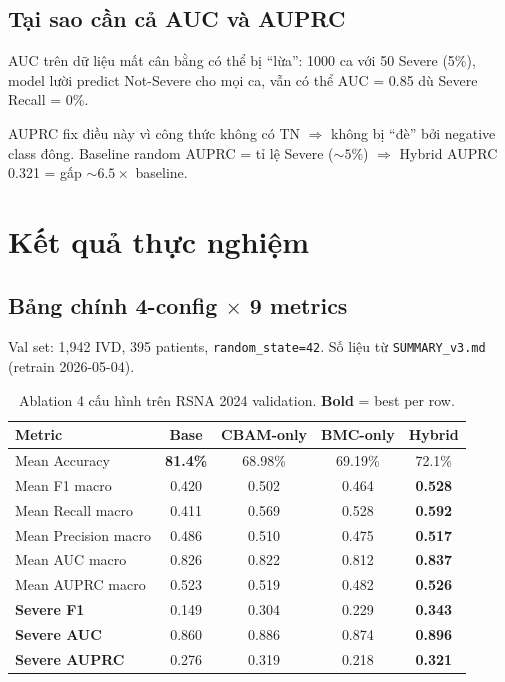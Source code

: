 \documentclass[11pt,a4paper]{article}
\newcommand{\best}[1]{\textcolor{best}{\textbf{#1}}}
\begin{document}
\subsection{Tại sao cần cả AUC và AUPRC}

\noindent AUC trên dữ liệu mất cân bằng có thể bị ``lừa'': 1000 ca với
50 Severe (5\%), model lười predict Not-Severe cho mọi ca, vẫn có thể
AUC = 0.85 dù Severe Recall = 0\%.

\noindent AUPRC fix điều này vì công thức không có TN $\Rightarrow$
không bị ``đè'' bởi negative class đông. Baseline random AUPRC = tỉ lệ
Severe ($\sim 5\%$) $\Rightarrow$ Hybrid AUPRC 0.321 = gấp $\sim 6.5
\times$ baseline.

\section{Kết quả thực nghiệm}

\subsection{Bảng chính 4-config $\times$ 9 metrics}

\noindent Val set: 1,942 IVD, 395 patients, \verb|random_state=42|.
Số liệu từ \texttt{SUMMARY\_v3.md} (retrain 2026-05-04).

\begin{table}[h]
\centering
\caption{Ablation 4 cấu hình trên RSNA 2024 validation. \best{Bold} = best per row.}
\label{tab:main_results}
\begin{tabular}{@{}lcccc@{}}
\toprule
\rowcolor{tablehdr}
Metric & Base & CBAM-only & BMC-only & \best{Hybrid} \\
\midrule
Mean Accuracy        & \best{81.4\%} & 68.98\% & 69.19\% & 72.1\% \\
Mean F1 macro        & 0.420 & 0.502 & 0.464 & \best{0.528} \\
Mean Recall macro    & 0.411 & 0.569 & 0.528 & \best{0.592} \\
Mean Precision macro & 0.486 & 0.510 & 0.475 & \best{0.517} \\
Mean AUC macro       & 0.826 & 0.822 & 0.812 & \best{0.837} \\
Mean AUPRC macro     & 0.523 & 0.519 & 0.482 & \best{0.526} \\
\midrule
\textbf{Severe F1}    & 0.149 & 0.304 & 0.229 & \best{0.343} \\
\textbf{Severe AUC}   & 0.860 & 0.886 & 0.874 & \best{0.896} \\
\textbf{Severe AUPRC} & 0.276 & 0.319 & 0.218 & \best{0.321} \\
\bottomrule
\end{tabular}
\end{table}
\end{document}
